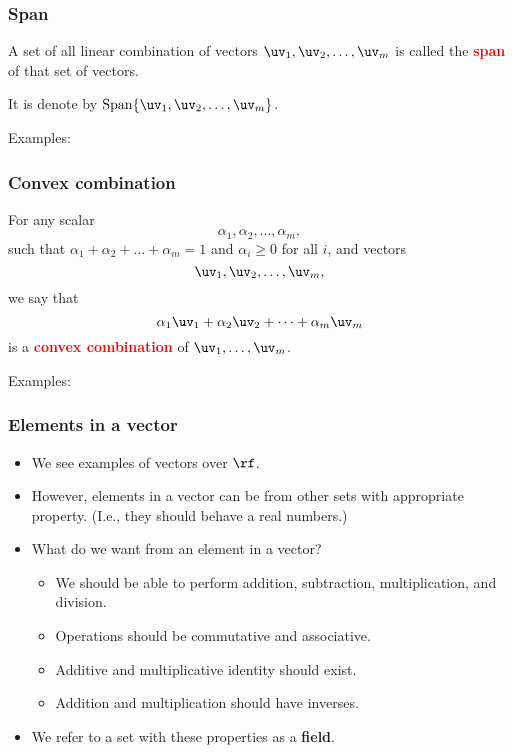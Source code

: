 \begin{frame}
  \frametitle{Span}

  A set of all linear combination of vectors $\uv_1,\uv_2,\ldots,\uv_m$ is called the \textcolor{red}{\bf span} of that set of vectors.

  It is denote by $\mathrm{Span} \{\uv_1,\uv_2,\ldots,\uv_m\}$.

  \vspace{0.3in}

  Examples:
  \vspace{2in}
\end{frame}

\begin{frame}
  \frametitle{Convex combination}
  For any scalar \
  \[
  \alpha_1,\alpha_2,\ldots,\alpha_m,
  \]
  such that $\alpha_1+\alpha_2+\ldots+\alpha_m=1$ and $\alpha_i\geq 0$ for all $i$,
  and vectors
  \[
  \uv_1,\uv_2,\ldots,\uv_m,
  \]
  we say that
  \[
  \alpha_1\uv_1 + \alpha_2\uv_2 + \cdots + \alpha_m \uv_m
  \]
  is a \textcolor{red}{\bf convex combination} of $\uv_1,\ldots,\uv_m$.
  \pause
  \vspace{0.2in}

  Examples:
  \vspace{1in}
\end{frame}

\begin{frame}
  \frametitle{Elements in a vector}
  \begin{itemize}
  \item We see examples of vectors over $\rf$.
  \item However, elements in a vector can be from other sets with
    appropriate property.  (I.e., they should behave a real numbers.)
  \item What do we want from an element in a vector?
    \pause
    \begin{itemize}
    \item We should be able to perform addition, subtraction, multiplication, and division.
      \pause
    \item Operations should be commutative and associative.
    \item Additive and multiplicative identity should exist.
    \item Addition and multiplication should have inverses.
    \end{itemize}
    \pause

    \item We refer to a set with these properties as a {\bf field}.
  \end{itemize}
\end{frame}

